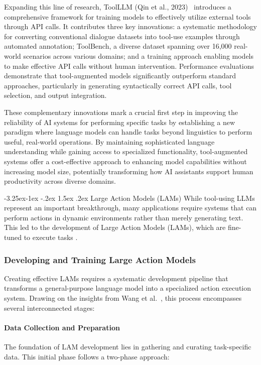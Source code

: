 \documentclass[journal,twoside,10pt]{IEEEtran}
\makeatletter
\renewcommand\subsection{\@startsection{subsection}{2}{\z@}%
                       {-3.25ex\@plus -1ex \@minus -.2ex}%
                       {1.5ex \@plus .2ex}%
                       {\normalfont\large\bfseries}}
\makeatother
\begin{document}
Expanding this line of research, ToolLLM (Qin et al., 2023)~\cite{qin2023toolllm} introduces a comprehensive framework for training models to effectively utilize external tools through API calls. It contributes three key innovations: a systematic methodology for converting conventional dialogue datasets into tool-use examples through automated annotation; ToolBench, a diverse dataset spanning over 16,000 real-world scenarios across various domains; and a training approach enabling models to make effective API calls without human intervention. Performance evaluations demonstrate that tool-augmented models significantly outperform standard approaches, particularly in generating syntactically correct API calls, tool selection, and output integration.

These complementary innovations mark a crucial first step in improving the reliability of AI systems for performing specific tasks by establishing a new paradigm where language models can handle tasks beyond linguistics to perform useful, real-world operations. By maintaining sophisticated language understanding while gaining access to specialized functionality, tool-augmented systems offer a cost-effective approach to enhancing model capabilities without increasing model size, potentially transforming how AI assistants support human productivity across diverse domains.

\subsection{Large Action Models (LAMs)}
While tool-using LLMs represent an important breakthrough, many applications require systems that can perform actions in dynamic environments rather than merely generating text. This led to the development of Large Action Models (LAMs), which are fine-tuned to execute tasks \cite{wang2025lam}.

\subsubsection{Developing and Training Large Action Models}

Creating effective LAMs requires a systematic development pipeline that transforms a general-purpose language model into a specialized action execution system. Drawing on the insights from Wang et al.~\cite{wang2025lam}, this process encompasses several interconnected stages:

\paragraph{Data Collection and Preparation}
The foundation of LAM development lies in gathering and curating task-specific data. This initial phase follows a two-phase approach:
\end{document}
